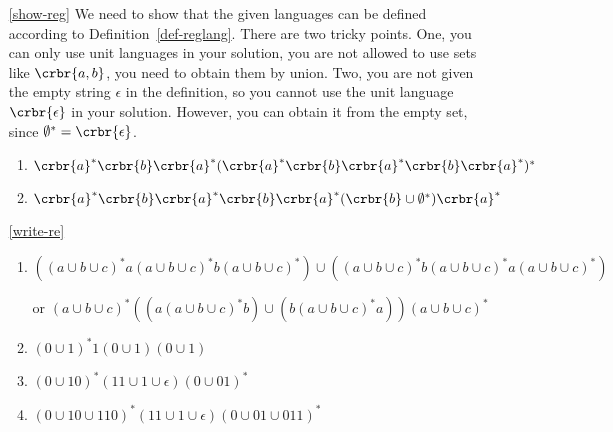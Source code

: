 \documentclass[11pt]{article}
\begin{document}
\begin{itemize}
\begin{enumerate}
\end{enumerate}
\item[\ref{show-reg}] We need to show that the given languages can be defined
according to Definition~\ref{def-reglang}. There are two tricky points. One,
you can only use unit languages in your solution, you are not allowed to
use sets like $\crbr{a,b}$, you need to obtain them by union. Two,  you are not
given the empty string $\epsilon$ in the definition, so you cannot use the unit
language $\crbr{\epsilon}$  in your solution. However, you can obtain it from
the empty set, since $\emptyset^*=\crbr{\epsilon}$.

\begin{enumerate}
\item $\crbr{a}^*\crbr{b}\crbr{a}^*(\crbr{a}^*\crbr{b}\crbr{a}^*\crbr{b}\crbr{a}^*)^*$ 

\item $\crbr{a}^*\crbr{b}\crbr{a}^*\crbr{b}\crbr{a}^*(\crbr{b}\cup\emptyset^*)\crbr{a}^*$ 

\end{enumerate}


\item[\ref{write-re}]
\begin{enumerate}
\item $((a\cup b \cup c)^*a(a\cup b \cup c)^*b(a\cup b \cup c)^*) \cup ((a\cup b \cup c)^*b(a\cup b \cup c)^*a(a\cup b \cup c)^*)$

or $(a\cup b \cup c)^*((a(a\cup b \cup c)^*b) \cup (b(a\cup b \cup c)^*a))(a\cup b \cup c)^*$

\item $(0\cup 1)^*1(0\cup 1)(0\cup 1)$

\item $(0\cup 10)^*(11\cup 1\cup \epsilon)(0\cup 01)^*$

\item $(0\cup 10 \cup 110)^*(11\cup 1\cup \epsilon)(0\cup 01\cup 011)^*$

\end{enumerate}
\end{itemize}
% 

% 
% 
\end{document}
